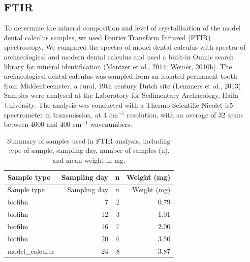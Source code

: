 \documentclass[
]{article}
\begin{document}
\hypertarget{ftir}{%
\subsection{FTIR}\label{ftir}}

To determine the mineral composition and level of crystallisation of the
model dental calculus samples, we used Fourier Transform Infrared (FTIR)
spectroscopy. We compared the spectra of model dental calculus with
spectra of archaeological and modern dental calculus and used a built-in
Omnic search library for mineral identification (Mentzer et al., 2014;
Weiner, 2010b). The archaeological dental calculus was sampled from an
isolated permanent tooth from Middenbeemster, a rural, 19th century
Dutch site (Lemmers et al., 2013). Samples were analysed at the
Laboratory for Sedimentary Archaeology, Haifa University. The analysis
was conducted with a Thermo Scientific Nicolet is5 spectrometer in
transmission, at 4 cm\(^{-1}\) resolution, with an average of 32 scans
between 4000 and 400 cm\(^{-1}\) wavenumbers.

\hypertarget{tbl-ftir-byoc}{}
\begin{longtable}[]{@{}lrrr@{}}
\caption{\label{tbl-ftir-byoc}Summary of samples used in FTIR analysis,
including type of sample, sampling day, number of samples (n), and mean
weight in mg.}\tabularnewline
\toprule\noalign{}
Sample type & Sampling day & n & Weight (mg) \\
\midrule\noalign{}
\endfirsthead
\toprule\noalign{}
Sample type & Sampling day & n & Weight (mg) \\
\midrule\noalign{}
\endhead
\bottomrule\noalign{}
\endlastfoot
biofilm & 7 & 2 & 0.79 \\
biofilm & 12 & 3 & 1.01 \\
biofilm & 16 & 7 & 2.00 \\
biofilm & 20 & 6 & 3.50 \\
model\_calculus & 24 & 8 & 3.87 \\
\end{longtable}
\end{document}
